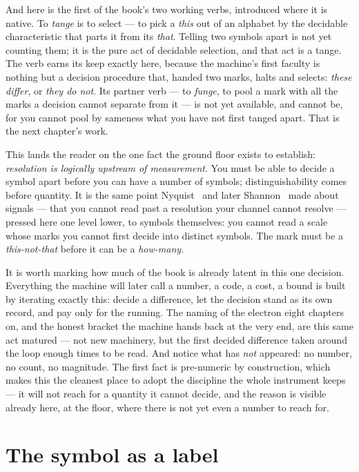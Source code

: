 And here is the first of the book's two working verbs, introduced where it is native. To \emph{tange} is to select ---
to pick a \emph{this} out of an alphabet by the decidable characteristic that parts it from its \emph{that}. Telling
two symbols apart is not yet counting them; it is the pure act of decidable selection, and that act is a tange. The
verb earns its keep exactly here, because the machine's first faculty is nothing but a decision procedure that, handed
two marks, halts and selects: \emph{these differ}, or \emph{they do not}. Its partner verb --- to \emph{funge}, to
pool a mark with all the marks a decision cannot separate from it --- is not yet available, and cannot be, for you
cannot pool by sameness what you have not first tanged apart. That is the next chapter's work.

This lands the reader on the one fact the ground floor exists to establish: \emph{resolution is logically upstream of
measurement}. You must be able to decide a symbol apart before you can have a number of symbols; distinguishability
comes before quantity. It is the same point Nyquist~\cite{nyquist1928} and later Shannon~\cite{shannon1949} made about
signals --- that you cannot read past a resolution your channel cannot resolve --- pressed here one level lower, to
symbols themselves: you cannot read a scale whose marks you cannot first decide into distinct symbols. The mark must be
a \emph{this-not-that} before it can be a \emph{how-many}.

It is worth marking how much of the book is already latent in this one decision. Everything the machine will later call
a number, a code, a cost, a bound is built by iterating exactly this: decide a difference, let the decision stand as
its own record, and pay only for the running. The naming of the electron eight chapters on, and the honest bracket the
machine hands back at the very end, are this same act matured --- not new machinery, but the first decided difference
taken around the loop enough times to be read. And notice what has \emph{not} appeared: no number, no count, no
magnitude. The first fact is pre-numeric by construction, which makes this the cleanest place to adopt the discipline
the whole instrument keeps --- it will not reach for a quantity it cannot decide, and the reason is visible already
here, at the floor, where there is not yet even a number to reach for.

\section{The symbol as a label}

